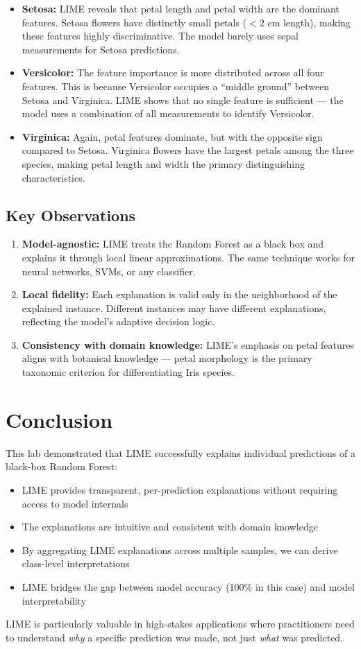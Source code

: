 \documentclass[12pt,a4paper]{article}
\begin{document}
\begin{itemize}
    \item \textbf{Setosa:} LIME reveals that petal length and petal width are the dominant features. Setosa flowers have distinctly small petals ($< 2$ cm length), making these features highly discriminative. The model barely uses sepal measurements for Setosa predictions.
    
    \item \textbf{Versicolor:} The feature importance is more distributed across all four features. This is because Versicolor occupies a ``middle ground'' between Setosa and Virginica. LIME shows that no single feature is sufficient --- the model uses a combination of all measurements to identify Versicolor.
    
    \item \textbf{Virginica:} Again, petal features dominate, but with the opposite sign compared to Setosa. Virginica flowers have the largest petals among the three species, making petal length and width the primary distinguishing characteristics.
\end{itemize}

\subsection{Key Observations}
\begin{enumerate}
    \item \textbf{Model-agnostic:} LIME treats the Random Forest as a black box and explains it through local linear approximations. The same technique works for neural networks, SVMs, or any classifier.
    \item \textbf{Local fidelity:} Each explanation is valid only in the neighborhood of the explained instance. Different instances may have different explanations, reflecting the model's adaptive decision logic.
    \item \textbf{Consistency with domain knowledge:} LIME's emphasis on petal features aligns with botanical knowledge --- petal morphology is the primary taxonomic criterion for differentiating Iris species.
\end{enumerate}

\section{Conclusion}
This lab demonstrated that LIME successfully explains individual predictions of a black-box Random Forest:
\begin{itemize}
    \item LIME provides transparent, per-prediction explanations without requiring access to model internals
    \item The explanations are intuitive and consistent with domain knowledge
    \item By aggregating LIME explanations across multiple samples, we can derive class-level interpretations
    \item LIME bridges the gap between model accuracy (100\% in this case) and model interpretability
\end{itemize}

LIME is particularly valuable in high-stakes applications where practitioners need to understand \emph{why} a specific prediction was made, not just \emph{what} was predicted.
\end{document}

